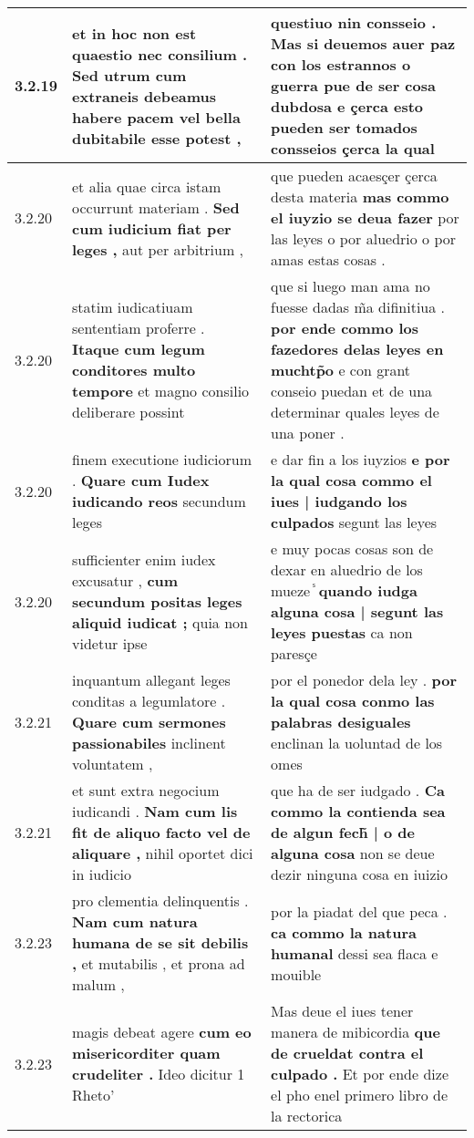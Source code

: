 \begin{tabular}{|p{1cm}|p{6.5cm}|p{6.5cm}|}
3.2.19 & et in hoc non est quaestio nec consilium . \textbf{ Sed utrum cum extraneis debeamus habere pacem } vel bella dubitabile esse potest , & questiuo nin consseio . \textbf{ Mas si deuemos auer paz con los estrannos o guerra pue de ser cosa dubdosa } e çerca esto pueden ser tomados consseios çerca la qual \\\hline
3.2.20 & et alia quae circa istam occurrunt materiam . \textbf{ Sed cum iudicium fiat per leges , } aut per arbitrium , & que pueden acaesçer çerca desta materia \textbf{ mas commo el iuyzio se deua fazer } por las leyes o por aluedrio o por amas estas cosas . \\\hline
3.2.20 & statim iudicatiuam sententiam proferre . \textbf{ Itaque cum legum conditores multo tempore } et magno consilio deliberare possint & que si luego man ama no fuesse dadas m̃a difinitiua . \textbf{ por ende commo los fazedores delas leyes en muchtp̃o } e con grant conseio puedan et de una determinar quales leyes de una poner . \\\hline
3.2.20 & finem executione iudiciorum . \textbf{ Quare cum Iudex iudicando reos } secundum leges & e dar fin a los iuyzios \textbf{ e por la qual cosa commo el iues | iudgando los culpados } segunt las leyes \\\hline
3.2.20 & sufficienter enim iudex excusatur , \textbf{ cum secundum positas leges aliquid iudicat ; } quia non videtur ipse & e muy pocas cosas son de dexar en aluedrio de los mueze ᷤ \textbf{ quando iudga alguna cosa | segunt las leyes puestas } ca non paresçe \\\hline
3.2.21 & inquantum allegant leges conditas a legumlatore . \textbf{ Quare cum sermones passionabiles } inclinent voluntatem , & por el ponedor dela ley . \textbf{ por la qual cosa conmo las palabras desiguales } enclinan la uoluntad de los omes \\\hline
3.2.21 & et sunt extra negocium iudicandi . \textbf{ Nam cum lis fit de aliquo facto vel de aliquare , } nihil oportet dici in iudicio & que ha de ser iudgado . \textbf{ Ca commo la contienda sea de algun fech̃ | o de alguna cosa } non se deue dezir ninguna cosa en iuizio \\\hline
3.2.23 & pro clementia delinquentis . \textbf{ Nam cum natura humana de se sit debilis , } et mutabilis , et prona ad malum , & por la piadat del que peca . \textbf{ ca commo la natura humanal } dessi sea flaca e mouible \\\hline
3.2.23 & magis debeat agere \textbf{ cum eo misericorditer quam crudeliter . } Ideo dicitur 1 Rheto’ & Mas deue el iues tener manera de mibicordia \textbf{ que de crueldat contra el culpado . } Et por ende dize el pho enel primero libro de la rectorica \\\hline

\end{tabular}
